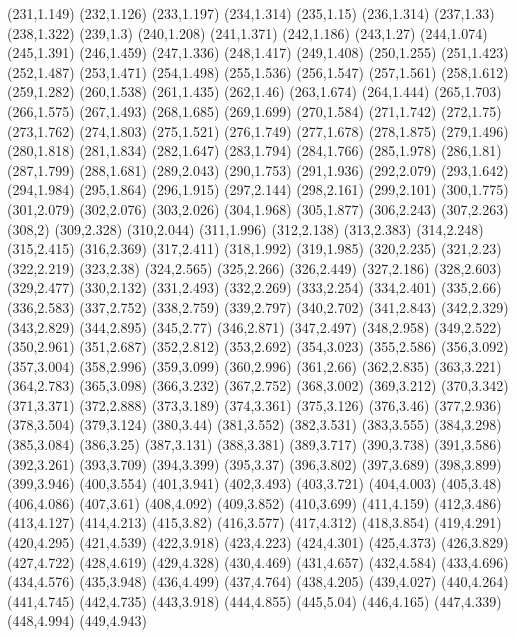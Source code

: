 (231,1.149)
(232,1.126)
(233,1.197)
(234,1.314)
(235,1.15)
(236,1.314)
(237,1.33)
(238,1.322)
(239,1.3)
(240,1.208)
(241,1.371)
(242,1.186)
(243,1.27)
(244,1.074)
(245,1.391)
(246,1.459)
(247,1.336)
(248,1.417)
(249,1.408)
(250,1.255)
(251,1.423)
(252,1.487)
(253,1.471)
(254,1.498)
(255,1.536)
(256,1.547)
(257,1.561)
(258,1.612)
(259,1.282)
(260,1.538)
(261,1.435)
(262,1.46)
(263,1.674)
(264,1.444)
(265,1.703)
(266,1.575)
(267,1.493)
(268,1.685)
(269,1.699)
(270,1.584)
(271,1.742)
(272,1.75)
(273,1.762)
(274,1.803)
(275,1.521)
(276,1.749)
(277,1.678)
(278,1.875)
(279,1.496)
(280,1.818)
(281,1.834)
(282,1.647)
(283,1.794)
(284,1.766)
(285,1.978)
(286,1.81)
(287,1.799)
(288,1.681)
(289,2.043)
(290,1.753)
(291,1.936)
(292,2.079)
(293,1.642)
(294,1.984)
(295,1.864)
(296,1.915)
(297,2.144)
(298,2.161)
(299,2.101)
(300,1.775)
(301,2.079)
(302,2.076)
(303,2.026)
(304,1.968)
(305,1.877)
(306,2.243)
(307,2.263)
(308,2)
(309,2.328)
(310,2.044)
(311,1.996)
(312,2.138)
(313,2.383)
(314,2.248)
(315,2.415)
(316,2.369)
(317,2.411)
(318,1.992)
(319,1.985)
(320,2.235)
(321,2.23)
(322,2.219)
(323,2.38)
(324,2.565)
(325,2.266)
(326,2.449)
(327,2.186)
(328,2.603)
(329,2.477)
(330,2.132)
(331,2.493)
(332,2.269)
(333,2.254)
(334,2.401)
(335,2.66)
(336,2.583)
(337,2.752)
(338,2.759)
(339,2.797)
(340,2.702)
(341,2.843)
(342,2.329)
(343,2.829)
(344,2.895)
(345,2.77)
(346,2.871)
(347,2.497)
(348,2.958)
(349,2.522)
(350,2.961)
(351,2.687)
(352,2.812)
(353,2.692)
(354,3.023)
(355,2.586)
(356,3.092)
(357,3.004)
(358,2.996)
(359,3.099)
(360,2.996)
(361,2.66)
(362,2.835)
(363,3.221)
(364,2.783)
(365,3.098)
(366,3.232)
(367,2.752)
(368,3.002)
(369,3.212)
(370,3.342)
(371,3.371)
(372,2.888)
(373,3.189)
(374,3.361)
(375,3.126)
(376,3.46)
(377,2.936)
(378,3.504)
(379,3.124)
(380,3.44)
(381,3.552)
(382,3.531)
(383,3.555)
(384,3.298)
(385,3.084)
(386,3.25)
(387,3.131)
(388,3.381)
(389,3.717)
(390,3.738)
(391,3.586)
(392,3.261)
(393,3.709)
(394,3.399)
(395,3.37)
(396,3.802)
(397,3.689)
(398,3.899)
(399,3.946)
(400,3.554)
(401,3.941)
(402,3.493)
(403,3.721)
(404,4.003)
(405,3.48)
(406,4.086)
(407,3.61)
(408,4.092)
(409,3.852)
(410,3.699)
(411,4.159)
(412,3.486)
(413,4.127)
(414,4.213)
(415,3.82)
(416,3.577)
(417,4.312)
(418,3.854)
(419,4.291)
(420,4.295)
(421,4.539)
(422,3.918)
(423,4.223)
(424,4.301)
(425,4.373)
(426,3.829)
(427,4.722)
(428,4.619)
(429,4.328)
(430,4.469)
(431,4.657)
(432,4.584)
(433,4.696)
(434,4.576)
(435,3.948)
(436,4.499)
(437,4.764)
(438,4.205)
(439,4.027)
(440,4.264)
(441,4.745)
(442,4.735)
(443,3.918)
(444,4.855)
(445,5.04)
(446,4.165)
(447,4.339)
(448,4.994)
(449,4.943)

